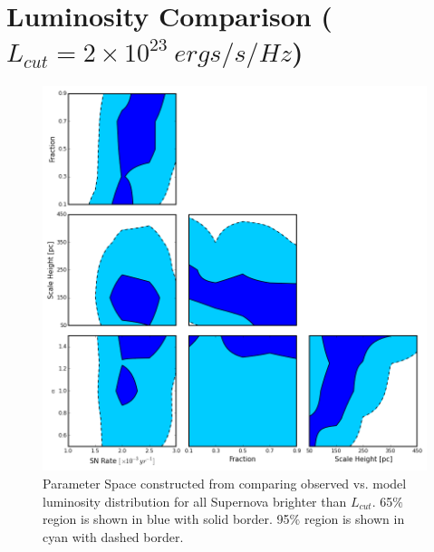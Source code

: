 \documentclass[10pt,a4paper]{article}
\begin{document}
\section* {Luminosity Comparison ($L_{cut} = 2 \times 10^{23}\ ergs/s/Hz$)}
\begin{figure}[h!]
\includegraphics[width=15cm]{TrianglePlot_Lums.png}
\caption{Parameter Space constructed from comparing observed vs. model luminosity distribution for all Supernova brighter than $L_{cut}$. 65$\%$ region is shown in blue with solid border. 95$\%$ region is shown in cyan with dashed border.}
\end{figure}
\newpage
\end{document}
